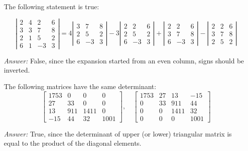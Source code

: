 \documentclass[letterpaper]{article}
\newcommand{\ans}{\textit{Answer: }}
\newenvironment{question}[2][Question]{\begin{trivlist}
\item[\hskip \labelsep {\bfseries #1}\hskip \labelsep {\bfseries #2.}]}{\end{trivlist}}
\begin{document}
\begin{question}{4.5}
  The following statement is true:

  $$
\left| \begin{array}{rrrr}{2} & {4} & {2} & {6} \\ {3} & {3} & {7} & {8} \\ {2} & {1} & {5} & {2} \\ {6} & {1} & {-3} & {3}\end{array}\right|=4 \left| \begin{array}{rrr}{3} & {7} & {8} \\ {2} & {5} & {2} \\ {6} & {-3} & {3}\end{array}\right|-3 \left| \begin{array}{rrr}{2} & {2} & {6} \\ {2} & {5} & {2} \\ {6} & {-3} & {3}\end{array}\right|
+\left| \begin{array}{rrr}{2} & {2} & {6} \\ {3} & {7} & {8} \\ {6} & {-3} & {3}\end{array}\right|-\left| \begin{array}{lll}{2} & {2} & {6} \\ {3} & {7} & {8} \\ {2} & {5} & {2}\end{array}\right|
$$

  \ans False, since the expansion started from an even column, signs should be inverted.
    
\end{question}

\begin{question}{4.6}
  The following matrices have the same determinant:
  $$\left[ \begin{array}{cccc}{1753} & {0} & {0} & {0} \\ {27} & {33} & {0} & {0} \\ {13} & {911} & {1411} & {0} \\ {-15} & {44} & {32} & {1001}\end{array}\right], \quad \left[ \begin{array}{rrrr}{1753} & {27} & {13} & {-15} \\ {0} & {33} & {911} & {44} \\ {0} & {0} & {1411} & {32} \\ {0} & {0} & {0} & {1001}\end{array}\right]$$

  \ans True, since the determinant of upper (or lower) triangular matrix is equal to 
  the product of the diagonal elements.
  
\end{question}
\end{document}
